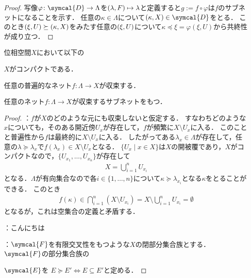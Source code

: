 \documentclass{ltjsbook}
\begin{document}
\begin{proof}
写像\(\varphi \colon \symcal{D} \to \Lambda\)を\((\lambda, F) \mapsto \lambda\)と定義すると\(g := f \circ \varphi\)は\(f\)のサブネットになることを示す．
任意の\(\kappa \in \Lambda\)について\(\tuple{\kappa, X} \in \symcal{D}\)をとる．
このとき\((\xi, U) \succeq (\kappa, X)\)をみたす任意の\((\xi, U)\)について\(\kappa \preceq \xi = \varphi(\xi, U)\)から共終性が成り立つ．


\end{proof}


\begin{thmbox}
\begin{theorem}
位相空間\(X\)において以下の
\begin{conditions}
    \item\label{compact-net-compact} \(X\)がコンパクトである．
    \item\label{compact-net-univ} 任意の普遍的なネット\(f\colon \Lambda \to X\)が収束する．
    \item\label{compact-net-subnet} 任意のネット\(f \colon \Lambda \to X\)が収束するサブネットをもつ．
\end{conditions}
\end{theorem}
\end{thmbox}

\begin{proof} ：\(f\)が\(X\)のどのような元にも収束しないと仮定する．
すなわちどのような\(x\)についても，そのある開近傍\(U_x\)が存在して，\(f\)が頻繁に\(X \setminus U_x\)に入る．
このことと普遍性から\(f\)は最終的に\(X \setminus U_x\)に入る．
したがってある\(\lambda_x \in \Lambda\)が存在して，任意の\(\lambda \succeq \lambda_x\)で\(f(\lambda_x) \in X \setminus U_x\)となる．
\(\{U_x \mid x \in X\}\)は\(X\)の開被覆であり，\(X\)がコンパクトなので，\(\{U_{x_1}, \ldots, U_{x_n}\}\)が存在して
\begin{align*}
    X = \bigcup_{i = 1}^n U_{x_i}
\end{align*}
となる．\(\Lambda\)が有向集合なので各\(i \in \{1, \ldots, n\}\)について\(\kappa \succeq \lambda_{x_i}\)となる\(\kappa\)をとることができる．
このとき
\begin{align*}
    f(\kappa) \in \bigcap_{i = 1}^n (X \setminus U_{x_i})
              = X \setminus \bigcup_{i = 1}^n U_{x_i}
              = \emptyset
\end{align*}
となるが，これは空集合の定義と矛盾する．

：こんにちは


：\(\symcal{F}\)を有限交叉性をもつような\(X\)の閉部分集合族とする．
\(\symcal{F}\)の部分集合族の


\(\symcal{E}\)を
\(E \succeq E' \Leftrightarrow E \subseteq E'\)と定める．
\end{proof}
\end{document}

